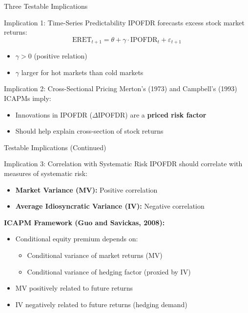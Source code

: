 \documentclass{beamer}
\begin{document}
\begin{frame}{Three Testable Implications}
\begin{block}{Implication 1: Time-Series Predictability}
IPOFDR forecasts excess stock market returns:
\[
\text{ERET}_{t+1} = \theta + \gamma \cdot \text{IPOFDR}_t + \varepsilon_{t+1}
\]
\begin{itemize}
    \item $\gamma > 0$ (positive relation)
    \item $\gamma$ larger for hot markets than cold markets
\end{itemize}
\end{block}


\begin{block}{Implication 2: Cross-Sectional Pricing}
Merton's (1973) and Campbell's (1993) ICAPMs imply:
\begin{itemize}
    \item Innovations in IPOFDR ($\Delta$IPOFDR) are a \textbf{priced risk factor}
    \item Should help explain cross-section of stock returns
\end{itemize}
\end{block}
\end{frame}

\begin{frame}{Testable Implications (Continued)}
\begin{block}{Implication 3: Correlation with Systematic Risk}
IPOFDR should correlate with measures of systematic risk:
\begin{itemize}
    \item \textbf{Market Variance (MV):} Positive correlation
    \item \textbf{Average Idiosyncratic Variance (IV):} Negative correlation
\end{itemize}
\end{block}


\textbf{ICAPM Framework (Guo and Savickas, 2008):}
\begin{itemize}
    \item Conditional equity premium depends on:
    \begin{itemize}
        \item Conditional variance of market returns (MV)
        \item Conditional variance of hedging factor (proxied by IV)
    \end{itemize}
    \item MV positively related to future returns
    \item IV negatively related to future returns (hedging demand)
\end{itemize}
\end{frame}
\end{document}
